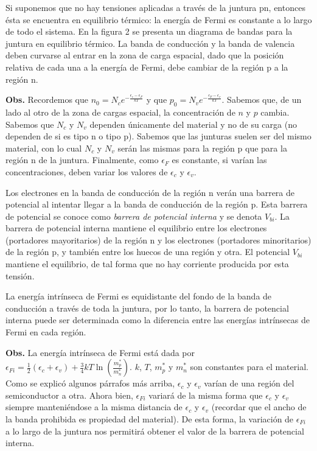 \documentclass[12pt,a4paper]{article}
\begin{document}
Si suponemos que no hay tensiones aplicadas a través de la juntura pn, entonces ésta se encuentra en equilibrio térmico: la energía de Fermi es constante a lo largo de todo el sistema. En la figura 2 se presenta un diagrama de bandas para la juntura en equilibrio térmico. La banda de conducción y la banda de valencia deben curvarse al entrar en la zona de carga espacial, dado que la posición relativa de cada una a la energía de Fermi, debe cambiar de la región p a la región n.

\textbf{Obs.} Recordemos que $n_{0}=N_{c}e^{-\frac{\epsilon _{c} - \epsilon _{F}}{kT}}$ y que $p_{0}=N_{v}e^{-\frac{\epsilon _{F} - \epsilon _{v}}{kT}}$. Sabemos que, de un lado al otro de la zona de cargas espacial, la concentración de $n$ y $p$ cambia. Sabemos que $N_{c}$ y $N_{v}$ dependen únicamente del material y no de su carga (no dependen de si es tipo n o tipo p). Sabemos que las junturas suelen ser del mismo material, con lo cual $N_{c}$ y $N_{v}$ serán las mismas para la región p que para la región n de la juntura. Finalmente, como $\epsilon _{F}$ es constante, si varían las concentraciones, deben variar los valores de $\epsilon _{c}$ y $\epsilon _{v}$.

Los electrones en la banda de conducción de la región n verán una barrera de potencial al intentar llegar a la banda de conducción de la región p. Esta barrera de potencial se conoce como \emph{barrera de potencial interna} y se denota $V_{bi}$. La barrera de potencial interna mantiene el equilibrio entre los electrones (portadores mayoritarios) de la región n y los electrones (portadores minoritarios) de la región p, y también entre los huecos de una región y otra. El potencial $V_{bi}$ mantiene el equilibrio, de tal forma que no hay corriente producida por esta tensión.

La energía intrínseca de Fermi es equidistante del fondo de la banda de conducción a través de toda la juntura, por lo tanto, la barrera de potencial interna puede ser determinada como la diferencia entre las energías intrínsecas de Fermi en cada región.

\textbf{Obs.} La energía intrínseca de Fermi está dada por $\epsilon _{Fi}=\frac{1}{2}(\epsilon _{c}+\epsilon _{v})+\frac{3}{4}kT \ln ( \frac{m_{p}^{\ast}}{m_{n}^{\ast}} )$. $k$, $T$, $m_{p}^{\ast}$ y $m_{n}^{\ast}$ son constantes para el material. Como se explicó algunos párrafos más arriba, $\epsilon _{c}$ y $\epsilon _{v}$ varían de una región del semiconductor a otra. Ahora bien, $\epsilon _{Fi}$ variará de la misma forma que $\epsilon _{c}$ y $\epsilon _{v}$ siempre manteniéndose a la misma distancia de $\epsilon _{c}$ y $\epsilon _{v}$ (recordar que el ancho de la banda prohibida es propiedad del material). De esta forma, la variación de $\epsilon _{Fi}$ a lo largo de la juntura nos permitirá obtener el valor de la barrera de potencial interna.
\end{document}

